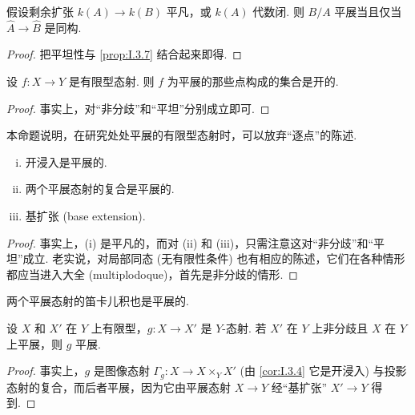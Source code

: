 \begin{corollary}\label{cor:I.4.4}
假设剩余扩张 $k(A) \to k(B)$ 平凡，或 $k(A)$ 代数闭. 则 $B/A$ 平展当且仅当 $\widehat{A} \to \widehat{B}$ 是同构.
\end{corollary}

\begin{proof}
把平坦性与 \ref{prop:I.3.7} 结合起来即得.
\end{proof}

\begin{proposition}\label{prop:I.4.5}
设 $f \colon X \to Y$ 是有限型态射. 则 $f$ 为平展的那些点构成的集合是开的.
\end{proposition}

\begin{proof}
事实上，对``非分歧''和``平坦''分别成立即可.
\end{proof}

本命题说明，在研究处处平展的有限型态射时，可以放弃``逐点''的陈述.

\begin{proposition}\label{prop:I.4.6}
\begin{enumerate}[(i)]
\item 开浸入是平展的.
\item 两个平展态射的复合是平展的.
\item 基扩张 (base extension).
\end{enumerate}
\end{proposition}

\begin{proof}
事实上，(i) 是平凡的，而对 (ii) 和 (iii)，只需注意这对``非分歧''和``平坦''成立. 老实说，对局部同态 (无有限性条件) 也有相应的陈述，它们在各种情形都应当进入大全 (multiplodoque)，首先是非分歧的情形.
\end{proof}

\begin{corollary}\label{cor:I.4.7}
两个平展态射的笛卡儿积也是平展的.
\end{corollary}

\begin{corollary}\label{cor:I.4.8}
设 $X$ 和 $X'$ 在 $Y$ 上有限型，$g \colon X \to X'$ 是 $Y$-态射. 若 $X'$ 在 $Y$ 上非分歧且 $X$ 在 $Y$ 上平展，则 $g$ 平展.
\end{corollary}

\begin{proof}
事实上，$g$ 是图像态射 $\Gamma_g \colon X \to X \times_Y X'$ (由 \ref{cor:I.3.4} 它是开浸入) 与投影态射的复合，而后者平展，因为它由平展态射 $X \to Y$ 经``基扩张'' $X' \to Y$ 得到.
\end{proof}

